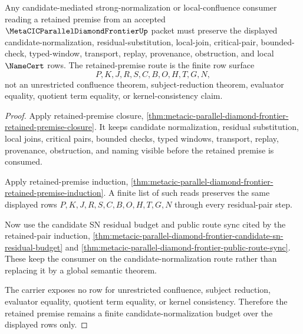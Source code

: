 \begin{theorem}
\label{thm:metacic-candidate-normalization-retained-premise}
Any candidate-mediated strong-normalization or local-confluence consumer reading a retained premise from an accepted $\MetaCICParallelDiamondFrontierUp$ packet must preserve the displayed candidate-normalization, residual-substitution, local-join, critical-pair, bounded-check, typed-window, transport, replay, provenance, obstruction, and local $\NameCert$ rows. The retained-premise route is the finite row surface
$$
P,K,J,R,S,C,B,O,H,T,G,N,
$$
not an unrestricted confluence theorem, subject-reduction theorem, evaluator equality, quotient term equality, or kernel-consistency claim.
\end{theorem}
\begin{proof}
Apply retained-premise closure, \autoref{thm:metacic-parallel-diamond-frontier-retained-premise-closure}. It keeps candidate normalization, residual substitution, local joins, critical pairs, bounded checks, typed windows, transport, replay, provenance, obstruction, and naming visible before the retained premise is consumed.

Apply retained-premise induction, \autoref{thm:metacic-parallel-diamond-frontier-retained-premise-induction}. A finite list of such reads preserves the same displayed rows $P,K,J,R,S,C,B,O,H,T,G,N$ through every residual-pair step.

Now use the candidate SN residual budget and public route sync cited by the retained-pair induction, \autoref{thm:metacic-parallel-diamond-frontier-candidate-sn-residual-budget} and \autoref{thm:metacic-parallel-diamond-frontier-public-route-sync}. These keep the consumer on the candidate-normalization route rather than replacing it by a global semantic theorem.

The carrier exposes no row for unrestricted confluence, subject reduction, evaluator equality, quotient term equality, or kernel consistency. Therefore the retained premise remains a finite candidate-normalization budget over the displayed rows only.
\end{proof}

